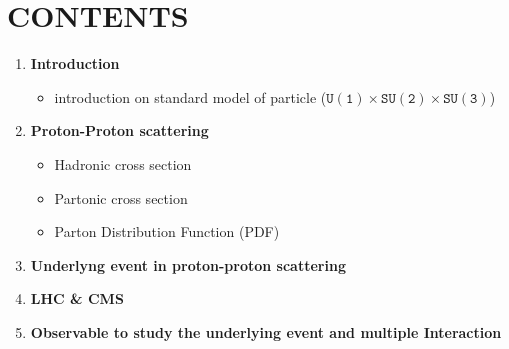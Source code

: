 \documentclass[10pt]{article}
\begin{document}
\section*{CONTENTS}

\begin{enumerate}[label=\arabic*)]
\item \textbf{Introduction} 
	\begin{itemize}
		\item introduction on standard model of particle ($\mathtt{U(1)\times SU(2)\times SU(3)}$)
	\end{itemize}
\item \textbf{Proton-Proton scattering}
	\begin{itemize}
		\item Hadronic cross section 
		\item Partonic cross section
		\item Parton Distribution Function (PDF)
	\end{itemize}
\item \textbf{Underlyng event in proton-proton scattering}
\item \textbf{LHC \& CMS}
\item \textbf{Observable to study the underlying event and multiple Interaction}
\end{enumerate}
\end{document}

